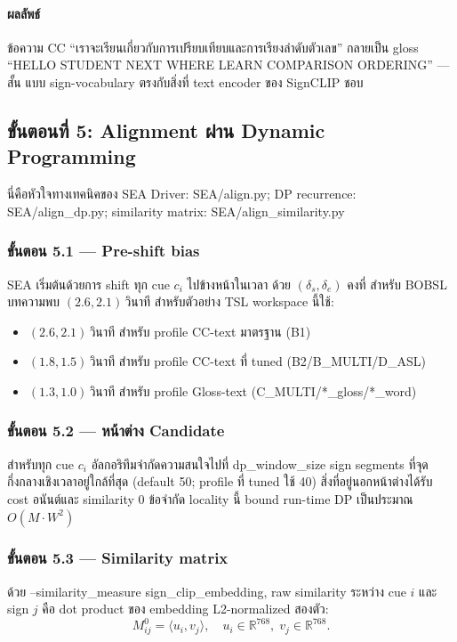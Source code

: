 \documentclass[11pt,a4paper]{article}
\def\texttt#1{#1}%
\def\emph#1{#1}%
\begin{document}
\paragraph{ผลลัพธ์}
ข้อความ CC \emph{``เราจะเรียนเกี่ยวกับการเปรียบเทียบและการเรียงลำดับตัวเลข''}
กลายเป็น gloss \emph{``HELLO STUDENT NEXT WHERE LEARN COMPARISON ORDERING''}
--- สั้น แบบ sign-vocabulary ตรงกับสิ่งที่ text encoder ของ SignCLIP ชอบ


\subsection{ขั้นตอนที่ 5: Alignment ผ่าน Dynamic Programming}
\label{sec:dp}

นี่คือหัวใจทางเทคนิคของ SEA Driver:
\texttt{SEA/align.py}; DP recurrence: \texttt{SEA/align\_dp.py};
similarity matrix: \texttt{SEA/align\_similarity.py}

\subsubsection{ขั้นตอน 5.1 --- Pre-shift bias}
SEA เริ่มต้นด้วยการ shift ทุก cue $c_i$ ไปข้างหน้าในเวลา
ด้วย $(\delta_s, \delta_e)$ คงที่ สำหรับ BOBSL บทความพบ $(2.6, 2.1)$\,วินาที
สำหรับตัวอย่าง TSL workspace นี้ใช้:
\begin{itemize}[leftmargin=1.5em]
  \item $(2.6, 2.1)$\,วินาที สำหรับ profile CC-text มาตรฐาน (B1)
  \item $(1.8, 1.5)$\,วินาที สำหรับ profile CC-text ที่ tuned (B2/B\_MULTI/D\_ASL)
  \item $(1.3, 1.0)$\,วินาที สำหรับ profile Gloss-text (C\_MULTI/*\_gloss/*\_word)
\end{itemize}

\subsubsection{ขั้นตอน 5.2 --- หน้าต่าง Candidate}
สำหรับทุก cue $c_i$ อัลกอริทึมจำกัดความสนใจไปที่
\texttt{dp\_window\_size} sign segments ที่จุดกึ่งกลางเชิงเวลาอยู่ใกล้ที่สุด
(default 50; profile ที่ tuned ใช้ 40)
สิ่งที่อยู่นอกหน้าต่างได้รับ cost อนันต์และ similarity 0
ข้อจำกัด locality นี้ bound run-time DP เป็นประมาณ $O(M \cdot W^2)$

\subsubsection{ขั้นตอน 5.3 --- Similarity matrix}
\label{sec:simmatrix}
ด้วย \texttt{--similarity\_measure sign\_clip\_embedding},
raw similarity ระหว่าง cue $i$ และ sign $j$
คือ dot product ของ embedding L2-normalized สองตัว:
\[
M^{0}_{ij} = \langle u_i, v_j\rangle, \quad u_i \in \mathbb{R}^{768},\;
v_j \in \mathbb{R}^{768}.
\]
\end{document}
